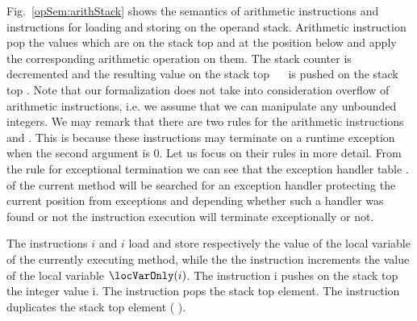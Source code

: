 Fig.\ \ref{opSem:arithStack}  shows the semantics of  arithmetic instructions and instructions for loading and storing on the operand stack. 
 Arithmetic instruction pop the values which are on the stack top \stackOnlyParam{\counterOnly}  and   at the position below
 and apply the corresponding arithmetic operation on them.
 The stack counter is decremented and  the resulting  value on the stack top  \ \op \ \stackOnlyParam{\counterOnly}
 is pushed on the stack  top  . Note that our formalization does not take into consideration overflow of arithmetic instructions, i.e.
 we assume that we can manipulate any unbounded integers.  
 We may remark that there are two rules  for the arithmetic instructions   and . This is because these instructions
 may terminate on a runtime exception when the second argument is 0. Let us focus on their rules in more detail. 
  From the rule for exceptional termination
 we can see that the exception handler table \methodd.\excHandlerTable{} of the current method will be searched 
for an exception handler protecting the current position \pc{} from \ArithExc{} exceptions and depending whether such a handler was
found or not the instruction execution will terminate exceptionally or not. 

  The instructions \load{} $i$ and \store{} $i$  load and store  respectively the value  of the 
  local variable of the currently executing method, while the 
  the instruction \iinc{} increments the value of the local variable $\locVarOnly(i)$.     
  The instruction  \push{} \textrm{i} pushes on the stack top the integer value \textrm{i}.
  The instruction \pop{} pops the stack top element. The instruction \dup{} duplicates the stack top element  \stackOnly( \counterOnly ).  


